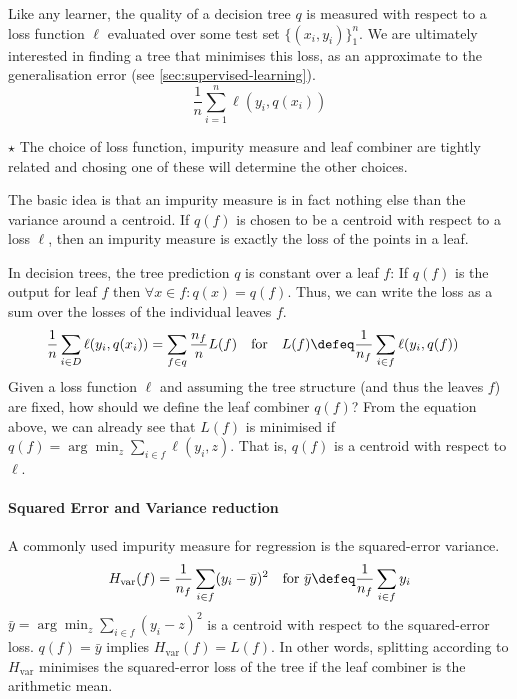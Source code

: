 \documentclass[../main.tex]{subfiles}
\begin{document}
Like any learner, the quality of a decision tree $q$ is measured with respect to a loss function $\ell$ evaluated over some test set $\{ (x_{i}, y_{i}) \}_{1}^n$. We are ultimately interested in finding a tree that minimises this loss, as an approximate to the generalisation error (see \cref{sec:supervised-learning}).
$$
\frac{1}{n} \sum_{i=1 }^n \ell(y_{i}, q(x_{i}))
$$

\begin{proposition} $\star$
    \label{thm:decision-trees-impurity}
The choice of loss function, impurity measure and leaf combiner are tightly related and chosing one of these will determine the other choices.
\end{proposition}
The basic idea is that an impurity measure is in fact nothing else than the variance around a centroid. 
If $q(f)$ is chosen to be a centroid with respect to a loss $\ell$, then an impurity measure is exactly the loss of the points in a leaf.

In decision trees, the tree prediction $q$ is constant over a leaf $f$: If $q(f)$ is the output for leaf $f$ then $\forall x \in f: q(x) = q(f)$. Thus, we can write the loss as a sum over the losses of the individual leaves $f$.
\begin{align*}
\frac{1}{n} \sum_{i\in D}  \ell(y_{i}, q(x_{i})) &= \sum_{f \in q} \frac{n_{f}}{n}  
L(f) 
\hspace{1em} \text{for~~ } L(f) \defeq \frac{1}{n_{f}} \sum_{i \in f} \ell(y_{i}, q(f))
\end{align*}
Given a loss function $\ell$ and assuming the tree structure (and thus the leaves $f$) are fixed, how should we define the leaf combiner $q(f)$? From the equation above, we can already see that $L(f)$ is minimised if $q(f) = \arg\min_{z} \sum_{i \in f} \ell(y_{i}, z)$. That is, $q(f)$ is a centroid with respect to $\ell$.
\paragraph{Squared Error and Variance reduction} A commonly used impurity measure for regression is the squared-error variance.
$$
H_{\text{var} }(f) = \frac{1}{n_{f}} \sum_{i\in f} (y_{i} - \bar{y})^2 \hspace{1em} \text{for~} \bar{y} \defeq \frac{1}{n_{f}} \sum_{i \in f} y_{i}
$$
$\bar{y} = \arg\min_{z} \sum_{i \in f} (y_{i} - z)^2$ is a centroid with respect to the squared-error loss.
$q(f) = \bar{y}$ implies $H_\text{var}(f) = L(f)$. In other words, splitting according to $H_{\text{var}}$ minimises the squared-error loss of the tree if the leaf combiner is the arithmetic mean.
\end{document}
